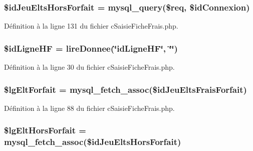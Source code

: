 \hypertarget{c_saisie_fiche_frais_8php_a225816061d7d40976793178f909f3f2f}{
\subsubsection[{\$id\-Jeu\-Elts\-Hors\-Forfait}]{\setlength{\rightskip}{0pt plus 5cm}\$id\-Jeu\-Elts\-Hors\-Forfait = mysql\-\_\-query(\$req, \$id\-Connexion)}}\label{c_saisie_fiche_frais_8php_a225816061d7d40976793178f909f3f2f}


Définition à la ligne 131 du fichier c\-Saisie\-Fiche\-Frais.\-php.

\hypertarget{c_saisie_fiche_frais_8php_a08c2ee78af26f9f01097c208a92dccb6}{
\subsubsection[{\$id\-Ligne\-H\-F}]{\setlength{\rightskip}{0pt plus 5cm}\$id\-Ligne\-H\-F = {\bf lire\-Donnee}(\char`\"{}id\-Ligne\-H\-F\char`\"{}, \char`\"{}\char`\"{})}}\label{c_saisie_fiche_frais_8php_a08c2ee78af26f9f01097c208a92dccb6}


Définition à la ligne 30 du fichier c\-Saisie\-Fiche\-Frais.\-php.

\hypertarget{c_saisie_fiche_frais_8php_a022a86765b1e04a80ab0d4fdf39e85c5}{
\subsubsection[{\$lg\-Elt\-Forfait}]{\setlength{\rightskip}{0pt plus 5cm}\$lg\-Elt\-Forfait = mysql\-\_\-fetch\-\_\-assoc(\$id\-Jeu\-Elts\-Frais\-Forfait)}}\label{c_saisie_fiche_frais_8php_a022a86765b1e04a80ab0d4fdf39e85c5}


Définition à la ligne 88 du fichier c\-Saisie\-Fiche\-Frais.\-php.

\hypertarget{c_saisie_fiche_frais_8php_aa394f8fa7752f4dc88580fee95a5489f}{
\subsubsection[{\$lg\-Elt\-Hors\-Forfait}]{\setlength{\rightskip}{0pt plus 5cm}\$lg\-Elt\-Hors\-Forfait = mysql\-\_\-fetch\-\_\-assoc(\$id\-Jeu\-Elts\-Hors\-Forfait)}}\label{c_saisie_fiche_frais_8php_aa394f8fa7752f4dc88580fee95a5489f}


